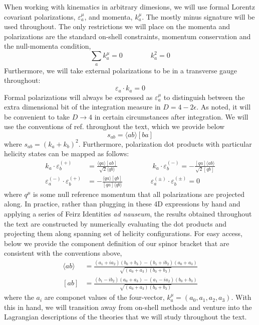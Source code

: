 \documentclass[12pt,letter]{article}
\def\be{\begin{equation}}
\def\ee{\end{equation}}
\begin{document}
When working with kinematics in arbitrary dimesions, we will use formal Lorentz covariant polarizations, $\varepsilon^\mu_a$, and momenta, $k^\mu_a$. The mostly minus signature will be used throughout. The only restrictions we will place on the momenta and polarizations are the standard on-shell constraints, momentum conservation and the null-momenta condition,
\be
\sum_{a} k_a^\mu =0 \qquad \qquad k_a^2 =0
\ee
Furthermore, we will take external polarizations to be in a transverse gauge throughout:
\be
\varepsilon_a \cdot k_a = 0
\ee
Formal polarizations will always be expressed as $\varepsilon_a^\mu$ to distinguish between the extra dimensional bit of the integration measure in $D=4-2\epsilon$. As noted, it will be convenient to take $D\rightarrow 4$ in certain circumstances after integration. We will use the conventions of ref. \cite{jjmcTASI2014} throughout the text, which we provide below
\be
s_{ab} = \langle ab \rangle[ba]
\ee
where $s_{ab} = (k_a+k_b)^2$. Furthermore, polarization dot products with particular helicity states can be mapped as follows:
\begin{align}
k_a \cdot \varepsilon_b^{(+)} &= \frac{\langle q a \rangle[ab]}{\sqrt{2}\langle q b\rangle}
\qquad\quad \qquad
k_a \cdot \varepsilon_b^{(-)} = -\frac{[qa]\langle ab\rangle}{\sqrt{2}[qb]}
\\
\varepsilon_a^{(-)}\cdot \varepsilon_b^{(+)} &= - \frac{\langle q a\rangle [qb]}{ [qa]\langle q b\rangle} 
\qquad \qquad
\varepsilon_a^{(\pm)}\cdot \varepsilon_b^{(\pm)} = 0 
\end{align}
where $q^\mu$ is some null reference momentum that all polarizations are projected along. In practice, rather than plugging in these 4D expressions by hand and applying a series of Feirz Identities \textit{ad nauseum}, the results obtained throughout the text are constructed by numerically evaluating the dot products and projecting them along spanning set of helicity configurations. For easy access, below we provide the component definition of our spinor bracket that are consistent with the conventions above,
\begin{align}
\langle ab \rangle &= \frac{(a_1 + i a_2)(b_0+b_3)-(b_1 + i b_2)(a_0+a_3)}{\sqrt{(a_0+a_3)(b_0+b_3)}}
\\
[ab] &= \frac{(b_1 - i b_2)(a_0+a_3)-(a_1 - i a_2)(b_0+b_3)}{\sqrt{(a_0+a_3)(b_0+b_3)}}
\end{align}
where the $a_i$ are componet values of the four-vector, $k^\mu_a = (a_0,a_1,a_2,a_3)$. With this in hand, we will transition away from on-shell methods and venture into the Lagrangian descriptions of the theories that we will study throughout the text. 
\end{document}

